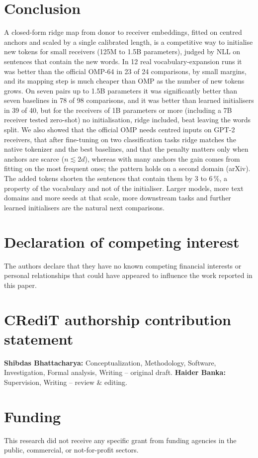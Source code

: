 \documentclass[preprint,12pt]{elsarticle}
\begin{document}
\section{Conclusion}
\label{sec:conclusion}
A closed-form ridge map from donor to receiver embeddings, fitted on centred anchors and scaled by a single calibrated length, is a competitive way to initialise new tokens for small receivers (125M to 1.5B parameters), judged by NLL on sentences that contain the new words. In 12 real vocabulary-expansion runs it was better than the official OMP-64 in 23 of 24 comparisons, by small margins, and its mapping step is much cheaper than OMP as the number of new tokens grows. On seven pairs up to 1.5B parameters it was significantly better than seven baselines in 78 of 98 comparisons, and it was better than learned initialisers in 39 of 40, but for the receivers of 1B parameters or more (including a 7B receiver tested zero-shot) no initialisation, ridge included, beat leaving the words split. We also showed that the official OMP needs centred inputs on GPT-2 receivers, that after fine-tuning on two classification tasks ridge matches the native tokenizer and the best baselines, and that the penalty matters only when anchors are scarce ($n\lesssim2d$), whereas with many anchors the gain comes from fitting on the most frequent ones; the pattern holds on a second domain (arXiv). The added tokens shorten the sentences that contain them by 3 to 6\,\%, a property of the vocabulary and not of the initialiser. Larger models, more text domains and more seeds at that scale, more downstream tasks and further learned initialisers are the natural next comparisons.

\section*{Declaration of competing interest}
The authors declare that they have no known competing financial interests or personal relationships that could have appeared to influence the work reported in this paper.

\section*{CRediT authorship contribution statement}
\textbf{Shibdas Bhattacharya:} Conceptualization, Methodology, Software, Investigation, Formal analysis, Writing -- original draft. \textbf{Haider Banka:} Supervision, Writing -- review \& editing.

\section*{Funding}
This research did not receive any specific grant from funding agencies in the public, commercial, or not-for-profit sectors.
\end{document}
